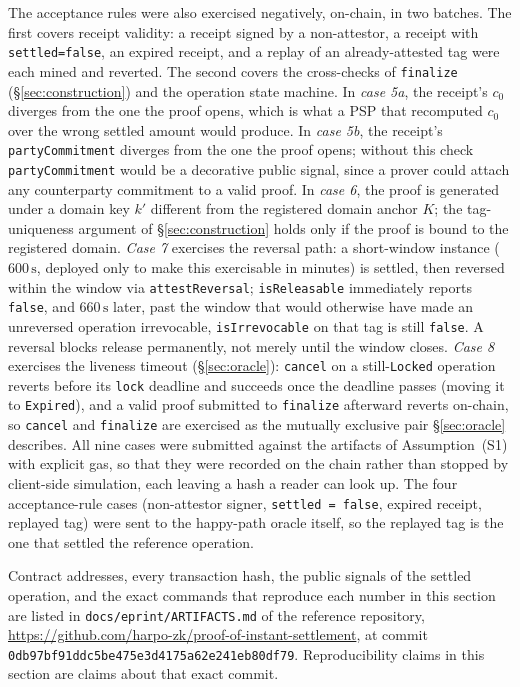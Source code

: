 \documentclass[11pt]{article}
\newcommand{\code}[1]{\texttt{#1}}
\begin{document}
The acceptance rules were also exercised negatively, on-chain, in two batches.
The first covers receipt validity: a receipt signed by a non-attestor, a
receipt with \code{settled=false}, an expired receipt, and a replay of an
already-attested tag were each mined and reverted. The second covers the
cross-checks of \code{finalize} (\S\ref{sec:construction}) and the operation
state machine. In \emph{case 5a}, the receipt's $c_0$ diverges from the one the
proof opens, which is what a PSP that recomputed $c_0$ over the wrong settled
amount would produce. In \emph{case 5b}, the receipt's \code{partyCommitment}
diverges from the one the proof opens; without this check
\code{partyCommitment} would be a decorative public signal, since a prover
could attach any counterparty commitment to a valid proof. In \emph{case 6},
the proof is generated under a domain key $k'$ different from the registered
domain anchor $K$; the tag-uniqueness argument of \S\ref{sec:construction}
holds only if the proof is bound to the registered domain. \emph{Case 7}
exercises the reversal path: a short-window instance ($600\,\mathrm{s}$,
deployed only to make this exercisable in minutes) is settled, then reversed
within the window via \code{attestReversal}; \code{isReleasable} immediately
reports \code{false}, and $660\,\mathrm{s}$ later, past the window that would
otherwise have made an unreversed operation irrevocable, \code{isIrrevocable}
on that tag is still \code{false}. A reversal blocks release permanently, not
merely until the window closes. \emph{Case 8} exercises the liveness timeout
(\S\ref{sec:oracle}): \code{cancel} on a still-\code{Locked} operation reverts
before its \code{lock} deadline and succeeds once the deadline passes (moving
it to \code{Expired}), and a valid proof submitted to \code{finalize}
afterward reverts on-chain, so \code{cancel} and \code{finalize} are exercised
as the mutually exclusive pair \S\ref{sec:oracle} describes. All nine cases
were submitted against the artifacts of Assumption~(S1) with explicit gas, so
that they were recorded on the chain rather than stopped by client-side
simulation, each leaving a hash a reader can look up. The four
acceptance-rule cases (non-attestor signer, \code{settled = false}, expired
receipt, replayed tag) were sent to the happy-path oracle itself, so the
replayed tag is the one that settled the reference operation.

\begingroup\sloppy
Contract addresses, every transaction hash, the public signals of the settled
operation, and the exact commands that reproduce each number in this section
are listed in \code{docs/eprint/ARTIFACTS.md} of the reference repository,
\url{https://github.com/harpo-zk/proof-of-instant-settlement}, at commit
\code{0db97bf91ddc\allowbreak 5be475e3d4\allowbreak 175a62e241\allowbreak eb80df79}. Reproducibility claims in
this section are claims about that exact commit.\par\endgroup
\end{document}
